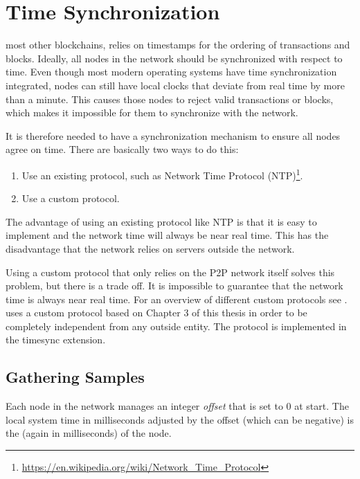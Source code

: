 \section{Time Synchronization}
\label{sec:timesync}


 most other blockchains, \codenamespace relies on timestamps for the ordering of transactions and blocks.
Ideally, all nodes in the network should be synchronized with respect to time.
Even though most modern operating systems have time synchronization integrated,
nodes can still have local clocks that deviate from real time by more than a minute.
This causes those nodes to reject valid transactions or blocks, which makes it impossible for them to synchronize with the network.

It is therefore needed to have a synchronization mechanism to ensure all nodes agree on time.
There are basically two ways to do this:
\begin{enumerate}
	\item{Use an existing protocol, such as Network Time Protocol (NTP)\footnote{\url{https://en.wikipedia.org/wiki/Network_Time_Protocol}}.}
	\item{Use a custom protocol.}
\end{enumerate}

The advantage of using an existing protocol like NTP is that it is easy to implement and the network time will always be near real time.
This has the disadvantage that the network relies on servers outside the network.

Using a custom protocol that only relies on the P2P network itself solves this problem, but there is a trade off.
It is impossible to guarantee that the network time is always near real time.
For an overview of different custom protocols see \cite{Scipioni2009}.
\codenamespace uses a custom protocol based on Chapter 3 of this thesis in order to be completely independent from any outside entity.
The protocol is implemented in the timesync extension.

\subsection{Gathering Samples}

Each node in the network manages an integer \emph{offset} that is set to 0 at start.
The local system time in milliseconds adjusted by the offset (which can be negative) is the  (again in milliseconds) of the node.

